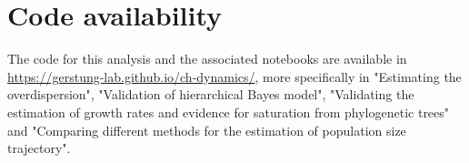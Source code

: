 \section{Code availability}

The code for this analysis and the associated notebooks are available in \url{https://gerstung-lab.github.io/ch-dynamics/}, more specifically in "Estimating the overdispersion", "Validation of hierarchical Bayes model", "Validating the estimation of growth rates and evidence for saturation from phylogenetic trees" and "Comparing different methods for the estimation of population size trajectory".
